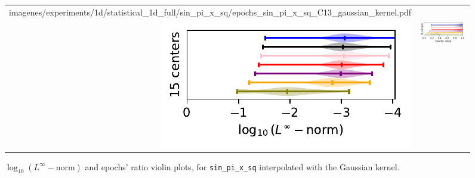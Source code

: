 \documentclass[12pt]{report} %
\begin{document}
\begin{figure}[H]
\begin{tabular}{rl}
{        {imagenes/experiments/1d/statistical_1d_full/sin_pi_x_sq/epochs_sin_pi_x_sq_C13_gaussian_kernel.pdf}}
    \\
    {\includegraphics[width=.5\textwidth, trim={0 0.2cm 0 0},clip=true]
    {imagenes/experiments/1d/statistical_1d_full/sin_pi_x_sq/linf_sin_pi_x_sq_C15_gaussian_kernel.pdf}}
                                                                                                              & 
  {\includegraphics[width=.44\textwidth, trim={.7cm 0.2cm 0 0},clip=true]
        {imagenes/experiments/1d/statistical_1d_full/sin_pi_x_sq/epochs_sin_pi_x_sq_C15_gaussian_kernel.pdf}}
  \end{tabular}
  \caption{$\log_{10}(L^\infty-\text{norm})$ and epochs' ratio violin plots, for \texttt{sin\_pi\_x\_sq} interpolated with the Gaussian kernel.}
  \label{fig:statistic-result-sin-pi-x-sq-gaussian-kernel}
\end{figure}
\end{document}
